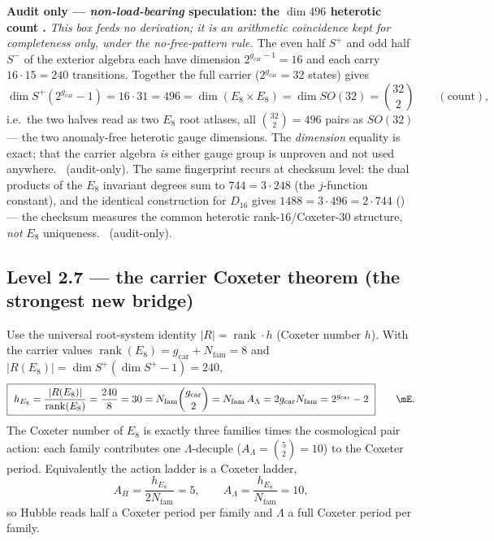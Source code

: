 \documentclass[11pt,a4paper]{article}
\newcommand{\gcar}{g_{\mathrm{car}}}
\newcommand{\Nfam}{N_{\mathrm{fam}}}
\theoremstyle{definition}
\begin{document}
\par\smallskip\noindent\textbf{Audit only --- \emph{non-load-bearing} speculation: the $\dim 496$ heterotic count \mO.}
\emph{This box feeds no derivation; it is an arithmetic coincidence kept for completeness only, under the
no-free-pattern rule.} The even half $S^+$ and odd half $S^-$ of the exterior algebra each have dimension
$2^{\gcar-1}=16$ and each carry $16\cdot15=240$ transitions. Together the full carrier ($2^{\gcar}=32$
states) gives
\[
  \dim S^+(2^{\gcar}-1)=16\cdot31=496=\dim(E_8\times E_8)=\dim SO(32)=\binom{32}{2}\qquad(\text{count}),
\]
i.e.\ the two halves read as two $E_8$ root atlases, all $\binom{32}{2}=496$ pairs as $SO(32)$ --- the two
anomaly-free heterotic gauge dimensions. The \emph{dimension} equality is exact; that the carrier algebra
\emph{is} either gauge group is unproven and not used anywhere. \mO\ (audit-only). The same fingerprint
recurs at checksum level: the dual products of the $E_8$ invariant degrees sum to $744=3\cdot248$ (the
$j$-function constant), and the identical construction for $D_{16}$ gives $1488=3\cdot496=2\cdot744$
() --- the checksum measures the common heterotic
rank-$16$/Coxeter-$30$ structure, \emph{not} $E_8$ uniqueness. \mE\ (audit-only).
\par\smallskip

\subsection{Level 2.7 --- the carrier Coxeter theorem (the strongest new bridge)}
Use the universal root-system identity $|R|=\operatorname{rank}\cdot h$ (Coxeter number $h$). With the
carrier values $\operatorname{rank}(E_8)=\gcar+\Nfam=8$ and $|R(E_8)|=\dim S^+(\dim S^+-1)=240$,
\begin{equation}
  \boxed{\ h_{E_8}=\frac{|R(E_8)|}{\operatorname{rank}(E_8)}=\frac{240}{8}=30
  =\Nfam\binom{\gcar}{2}=\Nfam\,A_\Lambda=2\gcar\Nfam=2^{\gcar}-2\ }\qquad\mE .
\end{equation}
The Coxeter number of $E_8$ is exactly three families times the cosmological pair action: each family
contributes one $\Lambda$-decuple ($A_\Lambda=\binom52=10$) to the Coxeter period. Equivalently the
action ladder is a Coxeter ladder,
\begin{equation}
  A_H=\frac{h_{E_8}}{2\Nfam}=5,\qquad A_\Lambda=\frac{h_{E_8}}{\Nfam}=10,
\end{equation}
so Hubble reads half a Coxeter period per family and $\Lambda$ a full Coxeter period per family. \mC
\end{document}
